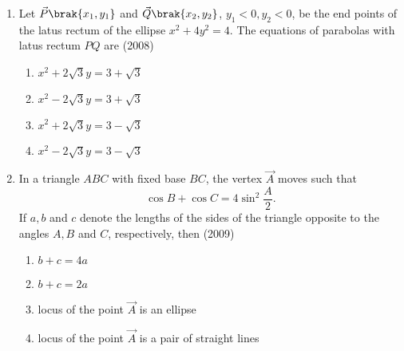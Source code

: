 \begin{enumerate}
\item Let $\vec{P}\brak{x_{1}, y_{1}}$ and $\vec{Q}\brak{x_{2},y_{2}}$, $y_{1}<0,y_{2}<0$, be the end points of the latus rectum of the ellipse $x^2+4y^2=4$. The equations of parabolas with latus rectum ${PQ}$ are \hfill(2008)
	\begin{multicols}{2}
	\begin{enumerate}
		\item $x^2+2\sqrt{3}y=3+\sqrt{3}$
		\item $x^2-2\sqrt{3}y=3+\sqrt{3}$
			\columnbreak
		\item $x^2+2\sqrt{3}y=3-\sqrt{3}$
		\item $x^2-2\sqrt{3}y=3-\sqrt{3}$
	\end{enumerate}\end{multicols}

\item In a triangle ${ABC}$ with fixed base ${BC}$, the vertex $\vec{A}$ moves such that
	$$\cos{B}+\cos{C}=4\sin^2{\frac{A}{2}}.$$
		If $a,b$ and $c$ denote the lengths of the sides of the triangle opposite to the angles $A,B$ and $C$, respectively, then \hfill(2009)\\
		\begin{enumerate}
			\item $b+c=4a$
			\item $b+c=2a$
			\item locus of the point $\vec{A}$ is an ellipse
			\item locus of the point $\vec{A}$ is a pair of straight lines
		\end{enumerate}


\end{enumerate}
